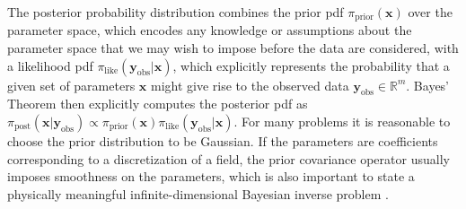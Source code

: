 \documentclass[11pt,final]{article}%
\renewcommand{\vec}[1] {\ensuremath{\boldsymbol{#1}}}
\begin{document}
The posterior probability distribution combines the prior pdf
$\pi_{\text{prior}}(\vec{x})$ over the parameter space, which encodes
any knowledge or assumptions about the parameter space that we may
wish to impose before the data are considered, with a likelihood pdf
$\pi_{\text{like}}(\vec{y}_{\text{obs}}|\vec{x})$, which explicitly
represents the probability that a given set of parameters $\vec{x}$
might give rise to the observed data $\vec{y}_{\text{obs}} \in
\mathbb{R}^m$.  Bayes' Theorem then explicitly computes the posterior
pdf as
$ \pi_{\text{post}}(\vec{x} | \vec{y}_{\text{obs}}) \propto
\pi_{\text{prior}}(\vec{x}) \pi_{\text{like}}(\vec{y}_{\text{obs}} | \vec{x})$.
%
For many problems it is reasonable to choose the prior distribution to
be Gaussian. If the parameters are coefficients corresponding to a
discretization of a field, the prior covariance operator usually
imposes smoothness on the parameters, which is also important to state a
physically meaningful infinite-dimensional Bayesian inverse problem
\cite{Stuart10,Bui-ThanhGhattasMartinEtAl13}.
\end{document}
